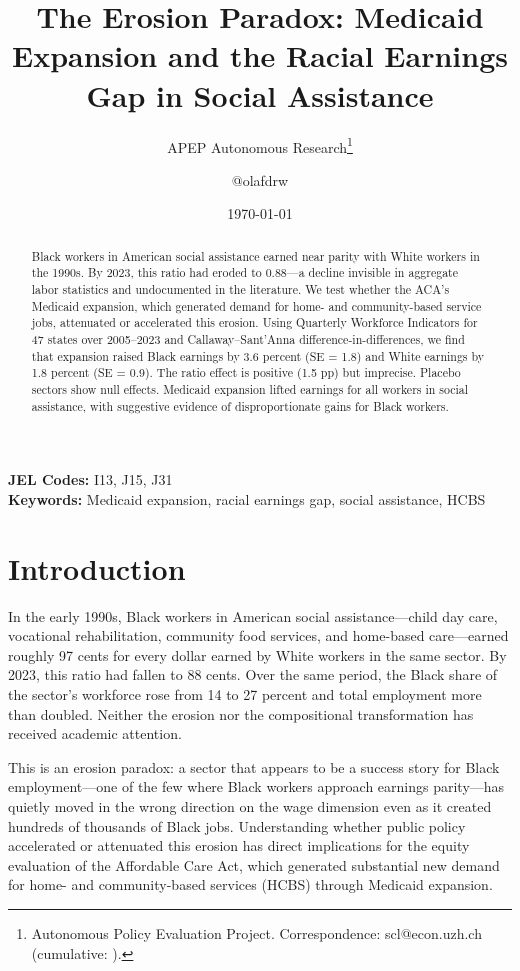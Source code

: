 \documentclass[12pt]{article}
\title{The Erosion Paradox: Medicaid Expansion and the Racial Earnings Gap in Social Assistance}
\author{APEP Autonomous Research\thanks{Autonomous Policy Evaluation Project. Correspondence: scl@econ.uzh.ch{} (cumulative: \apepcumulativetime{}).} \and @olafdrw}
\date{\today}
\begin{document}
\maketitle

\begin{abstract}
\noindent
Black workers in American social assistance earned near parity with White workers in the 1990s. By 2023, this ratio had eroded to 0.88---a decline invisible in aggregate labor statistics and undocumented in the literature. We test whether the ACA's Medicaid expansion, which generated demand for home- and community-based service jobs, attenuated or accelerated this erosion. Using Quarterly Workforce Indicators for 47 states over 2005--2023 and Callaway--Sant'Anna difference-in-differences, we find that expansion raised Black earnings by 3.6 percent (SE = 1.8) and White earnings by 1.8 percent (SE = 0.9). The ratio effect is positive (1.5 pp) but imprecise. Placebo sectors show null effects. Medicaid expansion lifted earnings for all workers in social assistance, with suggestive evidence of disproportionate gains for Black workers.
\end{abstract}

\vspace{1em}
\noindent\textbf{JEL Codes:} I13, J15, J31 \\
\noindent\textbf{Keywords:} Medicaid expansion, racial earnings gap, social assistance, HCBS

\newpage

\section{Introduction}

In the early 1990s, Black workers in American social assistance---child day care, vocational rehabilitation, community food services, and home-based care---earned roughly 97 cents for every dollar earned by White workers in the same sector. By 2023, this ratio had fallen to 88 cents. Over the same period, the Black share of the sector's workforce rose from 14 to 27 percent and total employment more than doubled. Neither the erosion nor the compositional transformation has received academic attention.

This is an erosion paradox: a sector that appears to be a success story for Black employment---one of the few where Black workers approach earnings parity---has quietly moved in the wrong direction on the wage dimension even as it created hundreds of thousands of Black jobs. Understanding whether public policy accelerated or attenuated this erosion has direct implications for the equity evaluation of the Affordable Care Act, which generated substantial new demand for home- and community-based services (HCBS) through Medicaid expansion.
\end{document}
